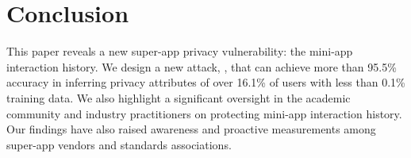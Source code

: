 
\section{Conclusion}

This paper reveals a new super-app privacy vulnerability: the mini-app interaction history. We design a new attack, \tool, that can achieve more than 95.5\% accuracy in inferring privacy attributes of {over 16.1\% of users} with less than 0.1\% training data. We also highlight a significant oversight in the academic community and industry practitioners on protecting mini-app interaction history. Our findings have also raised awareness and proactive measurements among super-app vendors and standards associations.

